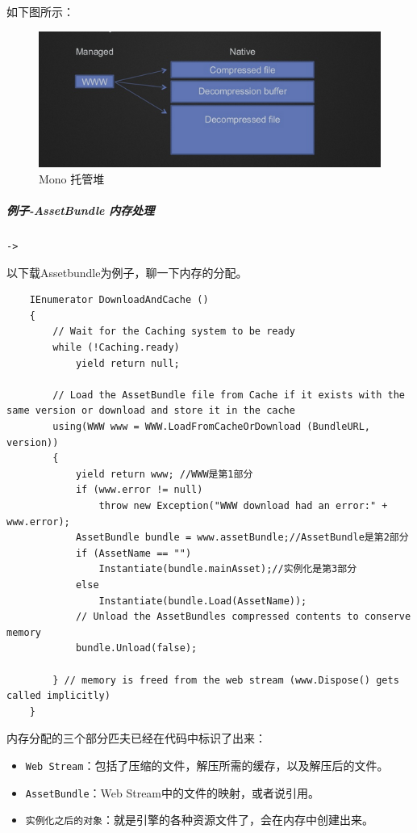 \documentclass[UTF8,a4paper,12pt]{ctexart}
\begin{document}
  				如下图所示：
  					\begin{figure}[H]
  						\centering
  						\includegraphics[scale=0.69]{Mono.png}
  						\caption{Mono 托管堆}
  					\end{figure}
  			
  			\subparagraph{例子-AssetBundle 内存处理}\verb|->|
  			
  				以下载Assetbundle为例子，聊一下内存的分配。
					\begin{lstlisting}
	IEnumerator DownloadAndCache ()
	{
		// Wait for the Caching system to be ready
		while (!Caching.ready)
			yield return null;
		
		// Load the AssetBundle file from Cache if it exists with the same version or download and store it in the cache
		using(WWW www = WWW.LoadFromCacheOrDownload (BundleURL, version))
		{
			yield return www; //WWW是第1部分
			if (www.error != null)
				throw new Exception("WWW download had an error:" + www.error);
			AssetBundle bundle = www.assetBundle;//AssetBundle是第2部分
			if (AssetName == "")
				Instantiate(bundle.mainAsset);//实例化是第3部分
			else
				Instantiate(bundle.Load(AssetName));
			// Unload the AssetBundles compressed contents to conserve memory
			bundle.Unload(false);
			
		} // memory is freed from the web stream (www.Dispose() gets called implicitly)
	}
					\end{lstlisting}
  		
  			内存分配的三个部分匹夫已经在代码中标识了出来：
  				\begin{itemize}
  					\item \verb|Web Stream|：包括了压缩的文件，解压所需的缓存，以及解压后的文件。
  					\item \verb|AssetBundle|：Web Stream中的文件的映射，或者说引用。
  					\item \verb|实例化之后的对象|：就是引擎的各种资源文件了，会在内存中创建出来。
  				\end{itemize}
  			
\end{document}

